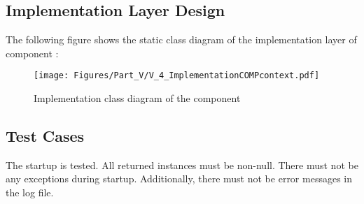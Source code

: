 \subsection{Implementation Layer Design}
\label{sec:ImplementationDesignCOMPcontext}

The following figure shows the static class diagram of the implementation layer of component \COMPcontext{}:

\begin{figure}[H]
	\centering
	\texttt{[image: Figures/Part\_V/V\_4\_ImplementationCOMPcontext.pdf]}
	\caption{Implementation class diagram of the component \COMPcontext{}}
	\label{fig:V_4_ImplementationCOMPcontext}
\end{figure}


\subsection{Test Cases}
\label{sec:TestCasesCOMPcontext}

The startup is tested. All returned instances must be non-null. There must not be any exceptions during startup. Additionally, there must not be error messages in the log file.

%
%

